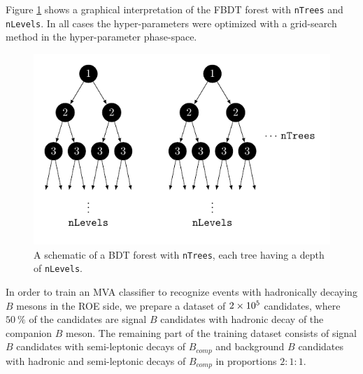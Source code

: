 Figure \ref{fig:BDT} shows a graphical interpretation of the FBDT forest with \texttt{nTrees} and \texttt{nLevels}. In all cases the hyper-parameters were optimized with a grid-search method in the hyper-parameter phase-space. 
\begin{figure}[H]
\centering
\captionsetup{width=0.8\linewidth}
\includegraphics[scale=1]{texfig/BDT_forest}
\caption{A schematic of a BDT forest with \texttt{nTrees}, each tree having a depth of \texttt{nLevels}.}
\label{fig:BDT}
\end{figure}

In order to train an MVA classifier to recognize events with hadronically decaying $B$ mesons in the ROE side, we prepare a dataset of $2\times 10^{5}$ candidates, where $50~\%$ of the candidates are signal $B$ candidates with hadronic decay of the companion $B$ meson. The remaining part of the training dataset consists of signal $B$ candidates with semi-leptonic decays of $B_{comp}$ and background $B$ candidates with hadronic and semi-leptonic decays of $B_{comp}$ in proportions $2:1:1$. 

